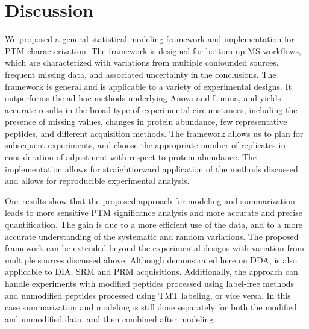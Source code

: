 \documentclass[mcp]{article}
\numberwithin{table}{section}
\begin{document}

\section{Discussion}

We proposed a general statistical modeling framework and implementation for PTM characterization. The framework is designed for bottom-up MS workflows, which are characterized with variations from multiple confounded sources, frequent missing data, and associated uncertainty in the conclusions. The framework is general and is applicable to a variety of experimental designs. It outperforms the ad-hoc methods underlying Anova and Limma, and yields accurate results in the broad type of experimental circumstances, including the presence of missing values, changes in protein abundance, few representative peptides, and different acquisition methods. The framework allows us to plan for subsequent experiments, and choose the appropriate number of replicates in consideration of adjustment with respect to protein abundance. The implementation allows for straightforward application of the methods discussed and allows for reproducible experimental analysis.

Our results show that the proposed approach for modeling and summarization leads to more sensitive PTM significance analysis and more accurate and precise quantification. The gain is due to a more efficient use of the data, and to a more accurate understanding of the systematic and random variations. The proposed framework can be extended beyond the experimental designs with variation from multiple sources discussed above. Although demonstrated here on DDA, is also applicable to DIA, SRM and PRM acquisitions. Additionally, the approach can handle experiments with modified peptides processed using label-free methods and unmodified peptides processed using TMT labeling, or vice versa. In this case summarization and modeling is still done separately for both the modified and unmodified data, and then combined after modeling.
\end{document}
